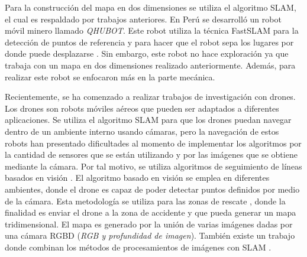 Para la construcción del mapa en dos dimensiones se utiliza el algoritmo SLAM, el cual es 
respaldado por trabajos anteriores. En Perú se desarrolló un robot móvil minero
llamado \textit{QHUBOT}. Este robot utiliza la técnica FastSLAM para la detección de puntos
de referencia y para hacer que el robot sepa los lugares por donde puede desplazarse 
\cite{Mauricio2015}. Sin embargo, este robot no hace exploración ya que trabaja con un mapa 
en dos dimensiones realizado anteriormente. Además, para realizar este robot se enfocaron
más en la parte mecánica.


Recientemente, se ha comenzado a realizar trabajos de investigación con drones. Los drones 
son robots móviles aéreos que pueden ser adaptados a diferentes aplicaciones. Se utiliza 
el algoritmo SLAM para que los drones puedan navegar dentro de un ambiente interno usando 
cámaras, pero la navegación de estos robots han presentado dificultades al momento de implementar 
los algoritmos por la cantidad de sensores que se están utilizando y por las imágenes
que se obtiene mediante la cámara. Por tal motivo, se utiliza algoritmos de seguimiento de 
líneas basados en visión \cite{Verschoor2013}. El algoritmo basado en visión se emplea en 
diferentes ambientes, donde el drone es capaz de poder detectar puntos definidos por medio 
de la cámara. Esta metodología se utiliza para las zonas de rescate \cite{Skoda2015}, donde 
la finalidad es enviar el drone a la zona de accidente y que pueda generar un mapa 
tridimensional. El mapa es generado por la unión de varias imágenes dadas por una cámara 
RGBD (\textit{RGB y profundidad de imagen}). También existe un trabajo donde combinan 
los métodos de procesamientos de imágenes con SLAM \cite{Heukels2015}.

